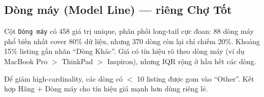 \subsection{Dòng máy (Model Line) --- riêng Chợ Tốt}

Cột \texttt{Dòng máy} có 458 giá trị unique, phân phối long-tail cực đoan: 88 dòng máy phổ biến nhất cover 80\% dữ liệu, nhưng 370 dòng còn lại chỉ chiếm 20\%. Khoảng 15\% listing gắn nhãn ``Dòng Khác''. Giá có tín hiệu rõ theo dòng máy (ví dụ MacBook Pro $>$ ThinkPad $>$ Inspiron), nhưng IQR rộng ở hầu hết các dòng.

Để giảm high-cardinality, các dòng có $<$ 10 listing được gom vào ``Other''. Kết hợp Hãng + Dòng máy cho tín hiệu giá mạnh hơn dùng riêng lẻ.
